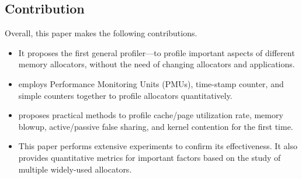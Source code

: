  




\subsection*{Contribution}

Overall, this paper makes the following contributions. 

\begin{itemize}
\item It proposes the first general profiler--\MP{}--to profile important aspects of different memory allocators, without the need of changing allocators and applications.  

\item \MP{} employs Performance Monitoring Units (PMUs), time-stamp counter, and simple counters together to profile allocators quantitatively. 

\item \MP{} proposes practical methods to profile cache/page utilization rate, memory blowup, active/passive false sharing, and kernel contention for the first time.
 
\item This paper performs extensive experiments to confirm its effectiveness. It also provides quantitative metrics for important factors based on the study of multiple widely-used allocators.    

\end{itemize} 

